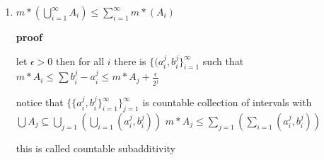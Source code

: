 \documentclass[letterpaper]{article}
\begin{document}
\begin{enumerate}
sum to infinity is bigger than sum to $n$. 
$\sum(b_1-a_i)+(b_2-a_2)+\dots+(b_n-a_n)\ge(a_2-a_1)+(a_3-a_2)\dots(a_n-a_n-1)+(b_n-a_n)=b_n-a_1\ge b-a$

and so $m*([a,b])\ge b-a$ and we already have less than so it's equal
\subsubsection*{example 2}
$m*((a,b))=b-a$ second part of limhof? thm, uniqueness

notice that the different sets are the same size
\subsubsection*{example 3}
$m*([a,\infty))=\infty$ notice that the measure of any subset is greater than or equal and so $[a,a+k]\subseteq[a,\infty)$ for all $k$ and so $k=m*[a,a+k]\le m*[a,\infty)\forall k$

\subsubsection*{example 4,5}
$m*\mathbb{Q},m*\mathbb{C}-\mathbb{R}$
\item
$m*(\bigcup_{i=1}^\infty A_i)\le\sum\limits_{i=1}^\infty{m*(A_i)}$

{\bfseries proof}

let $\epsilon>0$ then for all $i$ there is $\{(a_i^j,b_i^j\}_{i=1}^\infty$ such that $m*A_i\le\sum\limits{b_i^j-a_i^j}\le m*A_j+\frac{\epsilon}{2^j}$

notice that $\{\{a_i^j,b_i^j\}_{i=1}^\infty\}_{j=1}^\infty$ is countable collection of intervals with $\bigcup A_j\subseteq \bigcup_{j=1}(\bigcup_{i=1}(a_i^j,b_i^j))$
$m* A_j\le \sum_{j=1}(\sum_{i=1}(a_i^j,b_i^j))$

this is called countable subadditivity
\end{enumerate}
\end{document}
